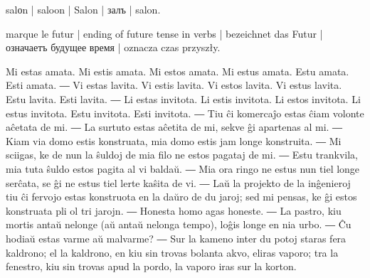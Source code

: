 \begin{ekzvocab}{1em}
 salоn | saloon | Salon | залъ | salon.

 marque le futur | ending of future tense in verbs | bezeichnet das Futur | означаетъ будущее время | oznacza czas przyszły.

\end{ekzvocab}

\newpage %


Mi estas amata. Mi estis amata. Mi estos amata. Mi estus amata. Estu amata. Esti amata. ― Vi estas lavita. Vi estis lavita. Vi estos lavita. Vi estus lavita. Estu lavita. Esti lavita. ― Li estas invitota. Li estis invitota. Li estos invitota. Li estus invitota. Estu invitota. Esti invitota. ― Tiu ĉi komercaĵo estas ĉiam volonte aĉetata de mi. ― La surtuto estas aĉetita de mi, sekve ĝi apartenas al mi. ― Kiam via domo estis konstruata, mia domo estis jam longe konstruita. ― Mi sciigas, ke de nun la ŝuldoj de mia filo ne estos pagataj de mi. ― Estu trankvila, mia tuta ŝuldo estos pagita al vi baldaŭ. ― Mia ora ringo ne estus nun tiel longe serĉata, se ĝi ne estus tiel lerte kaŝita de vi. ― Laŭ la projekto de la inĝenieroj tiu ĉi fervojo estas konstruota en la daŭro de du jaroj; sed mi pensas, ke ĝi estos konstruata pli ol tri jarojn. ― Honesta homo agas honeste. ― La pastro, kiu mortis antaŭ nelonge (aŭ antaŭ nelonga tempo), loĝis longe en nia urbo. ― Ĉu hodiaŭ estas varme aŭ malvarme? ― Sur la kameno inter du potoj staras fera kaldrono; el la kaldrono, en kiu sin trovas bolanta akvo, eliras vaporo; tra la fenestro, kiu sin trovas apud la pordo, la vaporo iras sur la korton.

